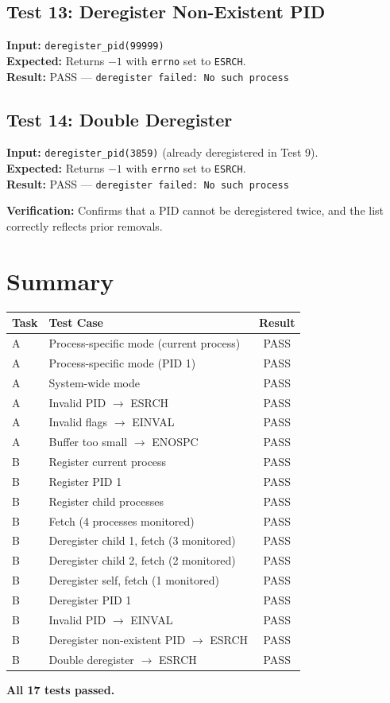 \documentclass[12pt,a4paper]{article}
\begin{document}
\subsection*{Test 13: Deregister Non-Existent PID}
\textbf{Input:} \texttt{deregister\_pid(99999)} \\
\textbf{Expected:} Returns $-1$ with \texttt{errno} set to \texttt{ESRCH}. \\
\textbf{Result:} PASS --- \texttt{deregister failed: No such process}

\subsection*{Test 14: Double Deregister}
\textbf{Input:} \texttt{deregister\_pid(3859)} (already deregistered in Test 9). \\
\textbf{Expected:} Returns $-1$ with \texttt{errno} set to \texttt{ESRCH}. \\
\textbf{Result:} PASS --- \texttt{deregister failed: No such process}

\textbf{Verification:} Confirms that a PID cannot be deregistered twice, and the list correctly reflects prior removals.

\section*{Summary}

\begin{table}[h]
\centering
\begin{tabular}{@{}llc@{}}
\toprule
\textbf{Task} & \textbf{Test Case} & \textbf{Result} \\
\midrule
A & Process-specific mode (current process) & PASS \\
A & Process-specific mode (PID 1) & PASS \\
A & System-wide mode & PASS \\
A & Invalid PID $\rightarrow$ ESRCH & PASS \\
A & Invalid flags $\rightarrow$ EINVAL & PASS \\
A & Buffer too small $\rightarrow$ ENOSPC & PASS \\
\midrule
B & Register current process & PASS \\
B & Register PID 1 & PASS \\
B & Register child processes & PASS \\
B & Fetch (4 processes monitored) & PASS \\
B & Deregister child 1, fetch (3 monitored) & PASS \\
B & Deregister child 2, fetch (2 monitored) & PASS \\
B & Deregister self, fetch (1 monitored) & PASS \\
B & Deregister PID 1 & PASS \\
B & Invalid PID $\rightarrow$ EINVAL & PASS \\
B & Deregister non-existent PID $\rightarrow$ ESRCH & PASS \\
B & Double deregister $\rightarrow$ ESRCH & PASS \\
\bottomrule
\end{tabular}
\end{table}

\noindent\textbf{All 17 tests passed.}
\end{document}
